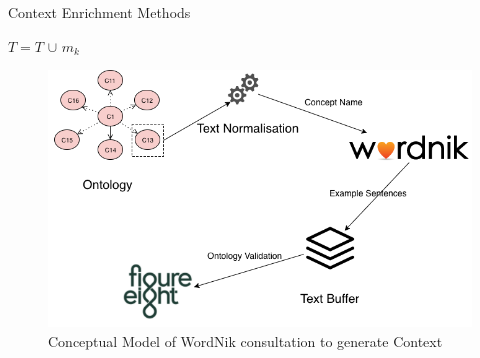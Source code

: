 \documentclass[final,hyperref={pdfpagelabels=true}]{beamer}
\begin{document}
\begin{frame}
\begin{columns}[t, onlytextwidth]
\begin{column}{\textwidth}
\begin{column}{\textwidth}
\begin{block}{Context Enrichment Methods}
\begin{minipage}[t]{.3\linewidth}
\begin{algorithm}[H]
\begin{algorithmic}
									\State $T=T$ $\cup$ $m_k$
								\EndFor
							\EndProcedure
						\end{algorithmic}
						\vspace{5mm}
					\end{algorithm}
				\end{minipage}
				\hfill\vline\hfill
			    \begin{minipage}[t]{.3\linewidth}
					\begin{center}						
						\textsc{\color{BeamerBlue}{Dictionary based Approach}}
					\end{center}
					\vspace{1cm}
					\begin{figure}[H]
						 \centering
						 \includegraphics[width=\textwidth]{figures/External_Source_Workflow}
						 \caption{Conceptual Model of WordNik consultation to generate Context}
					\end{figure}
				\end{minipage}
				\hfill
			\end{block}
		\end{column}
		

\end{column}
\end{columns}
\end{frame}
\end{document}
